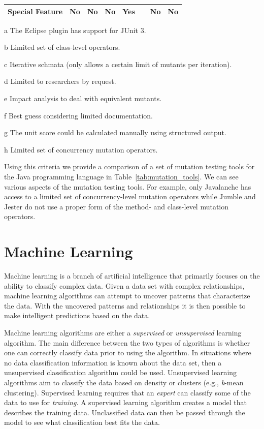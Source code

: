 \begin{table}
\begin{threeparttable}
\begin{tabular}{|l|l|l|l|l|l|l|}
      \hline \cellcolor[RGB]{169,196,223} \textbf{Special Feature} & No & No & No & Yes~\tnote{e}~\tnote{h} & No & No \\
      \hline
    \end{tabular}
    \begin{tablenotes}
      \item[a] The Eclipse plugin has support for JUnit 3.
      \item[b] Limited set of class-level operators.
      \item[c] Iterative schmata (only allows a certain limit of mutants per iteration).
      \item[d] Limited to researchers by request.
      \item[e] Impact analysis to deal with equivalent mutants.
      \item[f] Best guess considering limited documentation.
      \item[g] The unit score could be calculated manually using structured output.
      \item[h] Limited set of concurrency mutation operators.
    \end{tablenotes}
  \end{threeparttable}
\end{table}
\afterpage\clearpage

Using this criteria we provide a comparison of a set of mutation testing tools for the Java programming language in Table~\ref{tab:mutation_tools}. We can see various aspects of the mutation testing tools. For example, only Javalanche has access to a limited set of concurrency-level mutation operators while Jumble and Jester do not use a proper form of the method- and class-level mutation operators.


\section{Machine Learning}
\label{sec:background_machine_learning}
Machine learning is a branch of artificial intelligence that primarily focuses on the ability to classify complex data. Given a data set with complex relationships, machine learning algorithms can attempt to uncover patterns that characterize the data. With the uncovered patterns and relationships it is then possible to make intelligent predictions based on the data.

Machine learning algorithms are either a \emph{supervised} or \emph{unsupervised} learning algorithm. The main difference between the two types of algorithms is whether one can correctly classify data prior to using the algorithm. In situations where no data classification information is known about the data set, then a unsupervised classification algorithm could be used. Unsupervised learning algorithms aim to classify the data based on density or clusters (e.g., \emph{k}-mean clustering). Supervised learning requires that an \emph{expert} can classify some of the data to use for \emph{training}. A supervised learning algorithm creates a model that describes the training data. Unclassified data can then be passed through the model to see what classification best fits the data.

